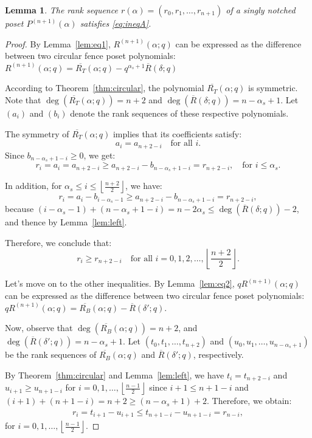 \documentclass{article}
\newtheorem{lemma}{Lemma}
\theoremstyle{remark}
\begin{document}
\begin{lemma}\label{lem:sineqA}
    The rank sequence $r(\alpha)=(r_0,r_1,\ldots,r_{n+1})$ of a singly notched poset $P^{(n+1)}(\alpha)$ satisfies \eqref{eq:ineqA}.
\end{lemma}
\begin{proof}

By Lemma~\ref{lem:eq1}, $R^{(n+1)}(\alpha; q)$ can be expressed as the difference between two circular fence poset polynomials: \(R^{(n+1)}(\alpha; q) = \overline{R_T}(\alpha; q) - q^{\alpha_s+ 1} \overline{R}(\delta; q)\)

According to Theorem~\ref{thm:circular}, the polynomial $\overline{R_T}(\alpha; q)$ is symmetric. Note that $\deg(\overline{R_T}(\alpha; q)) = n + 2$ and $\deg(\overline{R}(\delta; q)) = n - \alpha_s + 1$. Let $(a_i)$ and $(b_i)$ denote the rank sequences of these respective polynomials.

The symmetry of $\overline{R_T}(\alpha; q)$ implies that its coefficients satisfy:\[
a_i = a_{n + 2 - i} \quad \text{for all } i.
\]
Since \( b_{n - \alpha_s + 1 - i} \geq 0 \), we get:
\[
r_i = a_i = a_{n + 2 - i} \geq a_{n + 2 - i} - b_{n - \alpha_s + 1 - i} = r_{n + 2 - i}, \quad \text{for } i \leq \alpha_s.
\]

In addition, for \( \alpha_s \leq i \leq \left\lfloor \frac{n+2}{2} \right\rfloor \), we have:
\[
r_i = a_i - b_{i - \alpha_s - 1} \geq a_{n + 2 - i} - b_{n - \alpha_s + 1 - i} = r_{n + 2 - i},
\]
because \( (i - \alpha_s - 1) + (n - \alpha_s + 1 - i) = n - 2\alpha_s \leq \deg(\overline{R}(\delta; q)) - 2 \), and thence by Lemma~\ref{lem:left}.

Therefore, we conclude that:
\[
r_i \geq r_{n + 2 - i} \quad \text{for all } i = 0,1, 2, \ldots, \left\lfloor \frac{n+2}{2} \right\rfloor.
\]

Let's move on to the other inequalities. By Lemma~\ref{lem:eq2}, $qR^{(n+1)}(\alpha; q)$ can be expressed as the difference between two circular fence poset polynomials: \(q R^{(n+1)}(\alpha; q) = \overline{R_B}(\alpha; q) - \overline{R}(\delta'; q).\)


Now, observe that \( \deg(\overline{R_B}(\alpha; q)) = n + 2 \), and \( \deg(\overline{R}(\delta'; q)) = n - \alpha_s + 1 \). Let \( (t_0, t_1, \dots, t_{n+2}) \) and \( (u_0, u_1, \dots, u_{n - \alpha_s + 1}) \) be the rank sequences of \( \overline{R_B}(\alpha; q) \) and \( \overline{R}(\delta'; q) \), respectively.

By Theorem~\ref{thm:circular} and Lemma~\ref{lem:left}, we have \( t_i = t_{n + 2 - i} \) and $u_{i+1}\ge u_{n+1-i}$ for \( i = 0, 1, \dots, \left\lfloor \frac{n - 1}{2} \right\rfloor \) since $i+1\le n+1-i$ and $(i+1)+(n+1-i)=n+2\ge (n-\alpha_s+1)+2$. Therefore, we obtain:
\begin{align}
    r_i = t_{i+1} - u_{i+1} \leq t_{n + 1 - i} - u_{n + 1 - i} = r_{n - i},
\end{align}
for \( i = 0, 1, \dots, \left\lfloor \frac{n - 1}{2} \right\rfloor \).


\end{proof}
\end{document}
